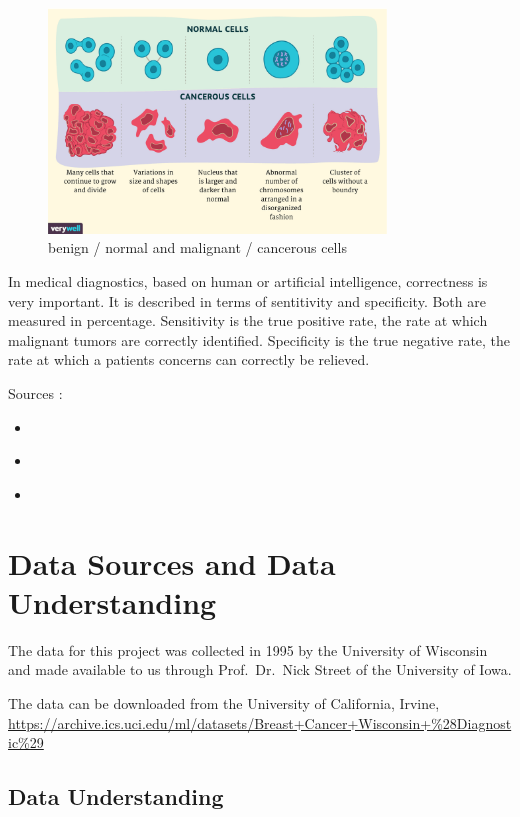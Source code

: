 \documentclass[]{article}
\begin{document}
\begin{figure}
    \centering
    \includegraphics[width=0.8\textwidth]{images/normal-vs-cancerous-cells.png}
    \caption{benign / normal and malignant / cancerous  cells}
    \label{fig:normal-vs-cancer}
\end{figure}

In medical diagnostics, based on human or artificial intelligence,
correctness is very important. It is described in terms of sentitivity
and specificity. Both are measured in percentage. Sensitivity is the
true positive rate, the rate at which malignant tumors are correctly
identified. Specificity is the true negative rate, the rate at which a
patients concerns can correctly be relieved.

Sources :

\begin{itemize}
\item
  \cite{rki}
\item
  \cite{malignant-and-benign}
\item
  \cite{cancer-cells-vs-normal}
\end{itemize}

\section{Data Sources and Data
Understanding}\label{data-sources-and-data-understanding}

The data for this project was collected in 1995 by the University of
Wisconsin and made available to us through Prof.~Dr.~Nick Street of the
University of Iowa.

The data can be downloaded from the University of California, Irvine,
\url{https://archive.ics.uci.edu/ml/datasets/Breast+Cancer+Wisconsin+\%28Diagnostic\%29}

\subsection{Data Understanding}\label{data-understanding}
\end{document}
